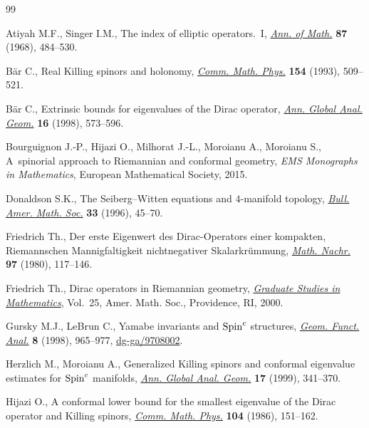 \begin{thebibliography}{99}
\footnotesize \itemsep=0pt

Atiyah M.F., Singer I.M., The index of elliptic operators.~{I}, \href{http://dx.doi.org/10.2307/1970715}{\textit{Ann. of
  Math.}} \textbf{87} (1968), 484--530.

B{\"a}r C., Real {K}illing spinors and holonomy, \href{http://dx.doi.org/10.1007/BF02102106}{\textit{Comm. Math. Phys.}}
  \textbf{154} (1993), 509--521.

B{\"a}r C., Extrinsic bounds for eigenvalues of the {D}irac operator,
  \href{http://dx.doi.org/10.1023/A:1006550532236}{\textit{Ann. Global Anal. Geom.}} \textbf{16} (1998), 573--596.

Bourguignon J.-P., Hijazi O., Milhorat J.-L., Moroianu A., Moroianu S.,
  A~spinorial approach to Riemannian and conformal geometry, \textit{EMS Monographs in
  Mathematics}, European Mathematical Society, 2015.

Donaldson S.K., The {S}eiberg--{W}itten equations and {$4$}-manifold topology,
  \href{http://dx.doi.org/10.1090/S0273-0979-96-00625-8}{\textit{Bull. Amer. Math. Soc.}} \textbf{33} (1996), 45--70.

Friedrich Th., Der erste {E}igenwert des {D}irac-{O}perators einer kompakten,
  {R}iemannschen {M}annigfaltigkeit nichtnegativer {S}kalarkr\"ummung,
  \href{http://dx.doi.org/10.1002/mana.19800970111}{\textit{Math. Nachr.}} \textbf{97} (1980), 117--146.

Friedrich Th., Dirac operators in {R}iemannian geometry, \href{http://dx.doi.org/10.1090/gsm/025}{\textit{Graduate
  Studies in Mathematics}}, Vol.~25, Amer. Math. Soc., Providence, RI, 2000.

Gursky M.J., LeBrun C., Yamabe invariants and {${\rm Spin}^c$} structures,
  \href{http://dx.doi.org/10.1007/s000390050120}{\textit{Geom. Funct. Anal.}} \textbf{8} (1998), 965--977,
  \href{http://arxiv.org/abs/dg-ga/9708002}{dg-ga/9708002}.

Herzlich M., Moroianu A., Generalized {K}illing spinors and conformal
  eigenvalue estimates for {${\rm Spin}^c$} manifolds, \href{http://dx.doi.org/10.1023/A:1006546915261}{\textit{Ann. Global
  Anal. Geom.}} \textbf{17} (1999), 341--370.

Hijazi O., A conformal lower bound for the smallest eigenvalue of the {D}irac
  operator and {K}illing spinors, \href{http://dx.doi.org/10.1007/BF01210797}{\textit{Comm. Math. Phys.}} \textbf{104}
  (1986), 151--162.


\end{thebibliography}
